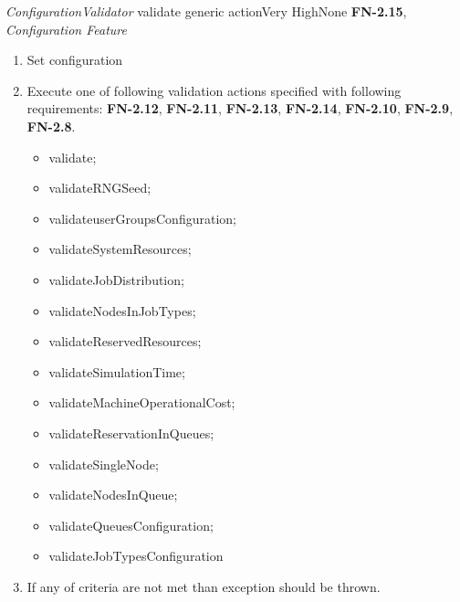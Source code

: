 \begin{testcase}{\emph{ConfigurationValidator} validate generic action}{Very High}{None}
	{
		\textbf{FN-2.15}, \emph{Configuration Feature}
	}
	{
		\begin{enumerate}
			\item Set configuration
			\item
			{
				Execute one of following validation actions specified with following requirements: \textbf{FN-2.12}, \textbf{FN-2.11}, \textbf{FN-2.13}, \textbf{FN-2.14}, \textbf{FN-2.10}, \textbf{FN-2.9}, \textbf{FN-2.8}.
				\begin{itemize}
					\item validate;
					\item validateRNGSeed;
					\item validateuserGroupsConfiguration;
					\item validateSystemResources;
					\item validateJobDistribution;
					\item validateNodesInJobTypes;
					\item validateReservedResources;
					\item validateSimulationTime;
					\item validateMachineOperationalCost;
					\item validateReservationInQueues;
					\item validateSingleNode;
					\item validateNodesInQueue;
					\item validateQueuesConfiguration;
					\item validateJobTypesConfiguration
				\end{itemize}
			}
			\item If any of criteria are not met than exception should be thrown. 
		\end{enumerate}
	}
\end{testcase}